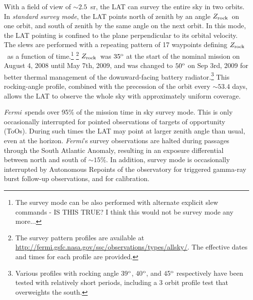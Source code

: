 \documentclass[aps,twocolumn,prd,superscriptaddress,showpacs,nofootinbib,fixfloat]{revtex4}
\newcommand{\Fermi}{{\slshape Fermi}}
\newcommand{\degree}{^{\rm o}}
\newcommand{\zrock}{$Z_{\rm rock}$}
\begin{document}



With a field of view of $\sim2.5$~sr, the LAT can survey the entire sky
in two orbits.  In \emph{standard survey mode}, the LAT points north of zenith
by an angle \zrock\ on one orbit, and south of zenith by the same angle on the
next orbit.  In this mode, the LAT pointing is confined to the plane
perpendicular to its orbital velocity.  The slews are
performed with a repeating pattern of 17 waypoints defining
\zrock\ as a function of time.\footnote{The survey mode can
be also performed with alternate explicit slew
commands - IS THIS TRUE?  I think this would not be survey mode any more...}
\footnote{The survey pattern profiles are available
at
\url{http://fermi.gsfc.nasa.gov/ssc/observations/types/allsky/}.
The effective dates and times for each profile are provided.
} \zrock\ was $35\degree$ at the start of the nominal
mission on August 4, 2008 until May 7th, 2009, and was changed
to $50\degree$ on Sep 3rd, 2009 for better thermal
management of the downward-facing battery
radiator.\footnote{Various profiles
with rocking angle 39$\degree$, 40$\degree$, and 45$\degree$
respectively have been tested with relatively short periods,
including a 3 orbit profile test that overweights the south.} 
This rocking-angle profile, combined with the precession
of the orbit every $\sim53.4$ days, allows the LAT to observe
the whole sky with approximately uniform coverage.

\Fermi\ spends over 95\% of the mission time in sky survey mode.
This is only occasionally interrupted for
pointed observations of targets of opportunity (ToOs).  During such times
the LAT may point at larger zenith angle than usual, even at the horizon.
\Fermi's survey observations are
halted during passages through the South
Atlantic Anomaly, resulting in an exposure
differential between north and south of $\sim15$\%. In addition,
survey mode is occasionally interrupted by Autonomous
Repoints of the observatory for triggered
gamma-ray burst follow-up observations, and for calibration.
\medskip
\end{document}
